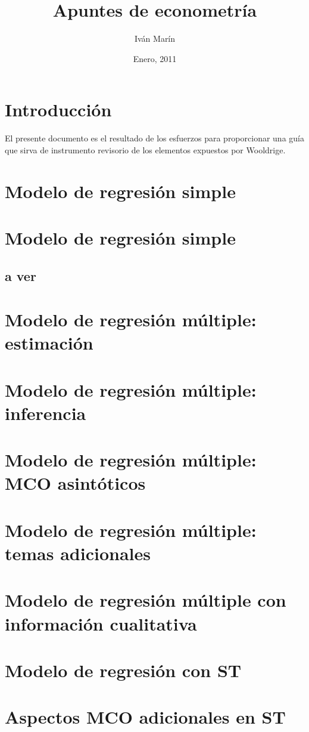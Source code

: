 \documentclass[a4paper,11pt]{book}
\begin{document}
\title{Apuntes de econometría}
\author{Iván Marín}
\date{Enero, 2011}
\maketitle
\chapter{Introducción}
El presente documento es el resultado de los esfuerzos para proporcionar una guía que sirva de instrumento revisorio de los elementos expuestos por Wooldrige.

\chapter{Modelo de regresión simple}
\chapter{Modelo de regresión simple}
\section{a ver}
\chapter{Modelo de regresión múltiple: estimación}
\chapter{Modelo de regresión múltiple: inferencia}
\chapter{Modelo de regresión múltiple: MCO asintóticos}
\chapter{Modelo de regresión múltiple: temas adicionales}
\chapter{Modelo de regresión múltiple con información cualitativa}
\chapter{Modelo de regresión con ST}
\chapter{Aspectos MCO adicionales en ST}
\end{document}
